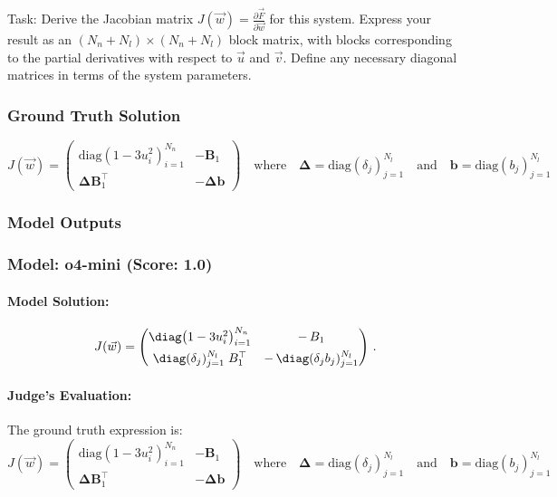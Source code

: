 \documentclass[10pt]{article}
\begin{document}
Task:
Derive the Jacobian matrix $J(\vec{w}) = \frac{\partial \vec{F}}{\partial \vec{w}}$ for this system. Express your result as an $(N_n+N_l) \times (N_n+N_l)$ block matrix, with blocks corresponding to the partial derivatives with respect to $\vec{u}$ and $\vec{v}$. Define any necessary diagonal matrices in terms of the system parameters.

\subsubsection*{Ground Truth Solution}
\[ \boxed{J(\vec{w}) = 
\begin{pmatrix}
\text{diag}(1 - 3u_i^2)_{i=1}^{N_n} & -\boldsymbol{B}_1 \\
\boldsymbol{\Delta} \boldsymbol{B}_1^\top & -\boldsymbol{\Delta} \boldsymbol{b}
\end{pmatrix}
\quad \text{where} \quad
\boldsymbol{\Delta} = \text{diag}(\delta_j)_{j=1}^{N_l} \quad \text{and} \quad \boldsymbol{b} = \text{diag}(b_j)_{j=1}^{N_l}} \]

\subsubsection*{Model Outputs}
\subsubsection*{Model: o4-mini (Score: 1.0)}
\paragraph*{Model Solution:}
\[ J(\vec w)=
\begin{pmatrix}
\diag\bigl(1-3u_{i}^{2}\bigr)_{i=1}^{N_{n}} & -\,B_{1} \\[1ex]
\diag(\delta_{j})_{j=1}^{N_{l}}\;B_{1}^{\top} & -\,\diag(\delta_{j}b_{j})_{j=1}^{N_{l}}
\end{pmatrix}\,. \]

\paragraph*{Judge's Evaluation:}

The ground truth expression is:
\[
J(\vec{w}) = 
\begin{pmatrix}
\text{diag}(1 - 3u_i^2)_{i=1}^{N_n} & -\boldsymbol{B}_1 \\
\boldsymbol{\Delta} \boldsymbol{B}_1^\top & -\boldsymbol{\Delta} \boldsymbol{b}
\end{pmatrix}
\quad \text{where} \quad
\boldsymbol{\Delta} = \text{diag}(\delta_j)_{j=1}^{N_l} \quad \text{and} \quad \boldsymbol{b} = \text{diag}(b_j)_{j=1}^{N_l}
\]
\end{document}
